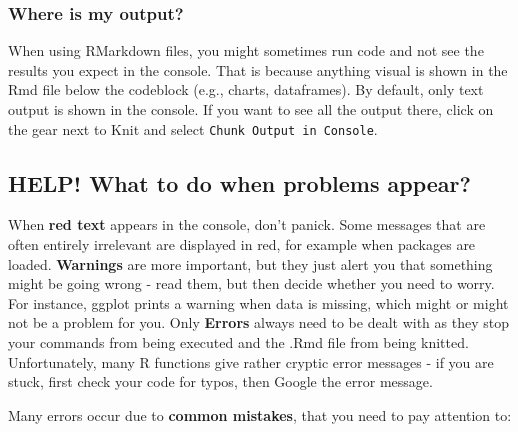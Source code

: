 \documentclass[
]{book}
\begin{document}
\hypertarget{where-is-my-output}{%
\subsubsection{Where is my output?}\label{where-is-my-output}}

When using RMarkdown files, you might sometimes run code and not see the results you expect in the console. That is because anything visual is shown in the Rmd file below the codeblock (e.g., charts, dataframes). By default, only text output is shown in the console. If you want to see all the output there, click on the gear next to Knit and select \texttt{Chunk\ Output\ in\ Console}.

\hypertarget{help-what-to-do-when-problems-appear}{%
\subsection{HELP! What to do when problems appear?}\label{help-what-to-do-when-problems-appear}}

When \textbf{red text} appears in the console, don't panick. Some messages that are often entirely irrelevant are displayed in red, for example when packages are loaded. \textbf{Warnings} are more important, but they just alert you that something might be going wrong - read them, but then decide whether you need to worry. For instance, ggplot prints a warning when data is missing, which might or might not be a problem for you. Only \textbf{Errors} always need to be dealt with as they stop your commands from being executed and the .Rmd file from being knitted. Unfortunately, many R functions give rather cryptic error messages - if you are stuck, first check your code for typos, then Google the error message.

Many errors occur due to \textbf{common mistakes}, that you need to pay attention to:
\end{document}
